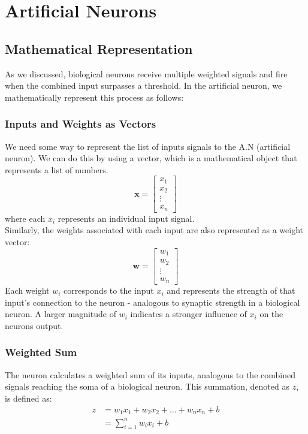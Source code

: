 \documentclass[9pt]{extarticle}
\theoremstyle{plain}
\theoremstyle{definition}
\theoremstyle{remark}
\begin{document}
\pagebreak

\section{Artificial Neurons}

\subsection{Mathematical Representation}
As we discussed, biological neurons receive multiple weighted
signals and fire when the combined input surpasses a threshold.
In the artificial neuron, we mathematically represent this process as follows:

\subsubsection{Inputs and Weights as Vectors}
We need some way to represent the list of inputs signals to the A.N (artificial neuron).
We can do this by using a vector, which is a mathematical object that represents a list of numbers.
$$\mathbf{x} = \begin{bmatrix} x_1 \\ x_2 \\ \vdots \\ x_n \end{bmatrix}$$
where each $x_i$ represents an individual input signal. \\
Similarly, the weights associated with each input are also represented as a weight vector:
$$\mathbf{w} = \begin{bmatrix} w_1 \\ w_2 \\ \vdots \\ w_n \end{bmatrix}$$
Each weight $w_i$ corresponds to the input $x_i$ and represents the
strength of that input's connection to the neuron - analogous to synaptic strength
in a biological neuron. A larger magnitude of $w_i$ indicates a stronger
influence of $x_i$ on the neurons output.


\subsubsection{Weighted Sum}

The neuron calculates a weighted sum of its inputs, analogous to the combined signals
reaching the soma of a biological neuron. This summation, denoted as $z$, is defined as:
\begin{align*}
    z & = w_1 x_1 + w_2 x_2 + \ldots + w_n x_n + b \\
      & = \sum_{i=1}^{n} w_i x_i + b
\end{align*}
\end{document}
